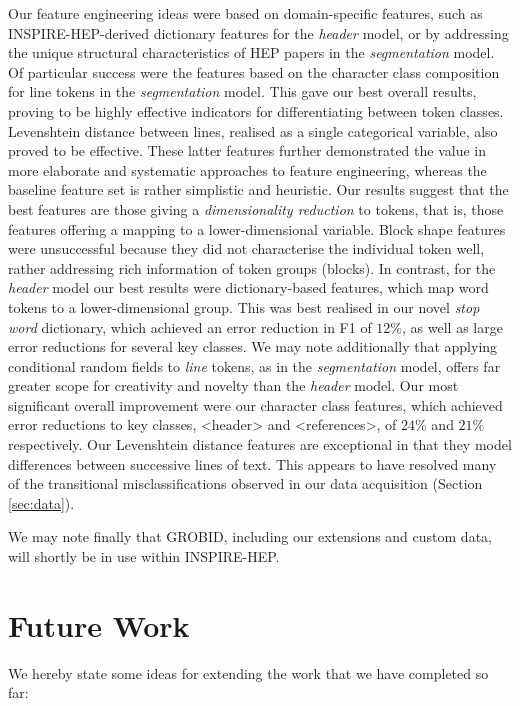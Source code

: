 Our feature engineering ideas were based on domain-specific features, such as INSPIRE-HEP-derived dictionary features for the \emph{header} model, or by addressing the unique structural characteristics of HEP papers in the \emph{segmentation} model. Of particular success were the features based on the character class composition for line tokens in the \emph{segmentation} model. This gave our best overall results, proving to be highly effective indicators for differentiating between token classes. Levenshtein distance between lines, realised as a single categorical variable, also proved to be effective. These latter features further demonstrated the value in more elaborate and systematic approaches to feature engineering, whereas the baseline feature set is rather simplistic and heuristic. Our results suggest that the best features are those giving a \emph{dimensionality reduction} to tokens, that is, those features offering a mapping to a lower-dimensional variable. Block shape features were unsuccessful because they did not characterise the individual token well, rather addressing rich information of token groups (blocks). In contrast, for the \emph{header} model our best results were dictionary-based features, which map word tokens to a lower-dimensional group. This was best realised in our novel \emph{stop word} dictionary, which achieved an error reduction in F1 of $12\%$, as well as large error reductions for several key classes. We may note additionally that applying conditional random fields to \emph{line} tokens, as in the \emph{segmentation} model, offers far greater scope for creativity and novelty than the \emph{header} model. Our most significant overall improvement were our character class features, which achieved error reductions to key classes, <header> and <references>, of $24\%$ and $21\%$ respectively. Our Levenshtein distance features are exceptional in that they model differences between successive lines of text. This appears to have resolved many of the transitional misclassifications observed in our data acquisition (Section \ref{sec:data}).

We may note finally that GROBID, including our extensions and custom data, will shortly be in use within INSPIRE-HEP.

\section{Future Work}
\label{sec:futurework}

We hereby state some ideas for extending the work that we have completed so far:

